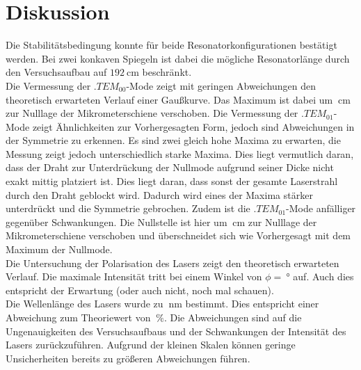 
\section{Diskussion}
\label{sec:Diskussion}

Die Stabilitätsbedingung konnte für beide Resonatorkonfigurationen bestätigt werden. Bei zwei konkaven Spiegeln ist dabei die mögliche Resonatorlänge durch den Versuchsaufbau auf $\SI{192}{\centi\metre}$ beschränkt.\\
Die Vermessung der $.{TEM}_{00}$-Mode zeigt mit geringen Abweichungen den theoretisch erwarteten Verlauf einer Gaußkurve. Das Maximum ist dabei um $\SI{}{\centi\meter}$ zur Nulllage der Mikrometerschiene verschoben.
Die Vermessung der $.{TEM}_{01}$-Mode zeigt Ähnlichkeiten zur Vorhergesagten Form, jedoch sind Abweichungen in der Symmetrie zu erkennen. Es sind zwei gleich hohe Maxima zu erwarten, die Messung zeigt jedoch unterschiedlich starke Maxima. Dies liegt vermutlich daran, dass der Draht zur Unterdrückung der Nullmode aufgrund seiner Dicke nicht exakt mittig platziert ist. Dies liegt daran, dass sonst der gesamte Laserstrahl durch den Draht geblockt wird. Dadurch wird eines der Maxima stärker unterdrückt und die Symmetrie gebrochen. Zudem ist die $.{TEM}_{01}$-Mode anfälliger gegenüber Schwankungen. 
Die Nullstelle ist hier um $\SI{}{\centi\meter}$ zur Nulllage der Mikrometerschiene verschoben und überschneidet sich wie Vorhergesagt mit dem Maximum der Nullmode.\\
Die Untersuchung der Polarisation des Lasers zeigt den theoretisch erwarteten Verlauf. Die maximale Intensität tritt bei einem Winkel von $\phi=\SI{}{\degree}$ auf. Auch dies entspricht der Erwartung (oder auch nicht, noch mal schauen).\\
Die Wellenlänge des Lasers wurde zu $\SI{}{\nano\metre}$ bestimmt. Dies entspricht einer Abweichung zum Theoriewert von $\SI{}{\%}$. Die Abweichungen sind auf die Ungenauigkeiten des Versuchsaufbaus und der Schwankungen der Intensität des Lasers zurückzuführen. Aufgrund der kleinen Skalen können geringe Unsicherheiten bereits zu größeren Abweichungen führen.  
